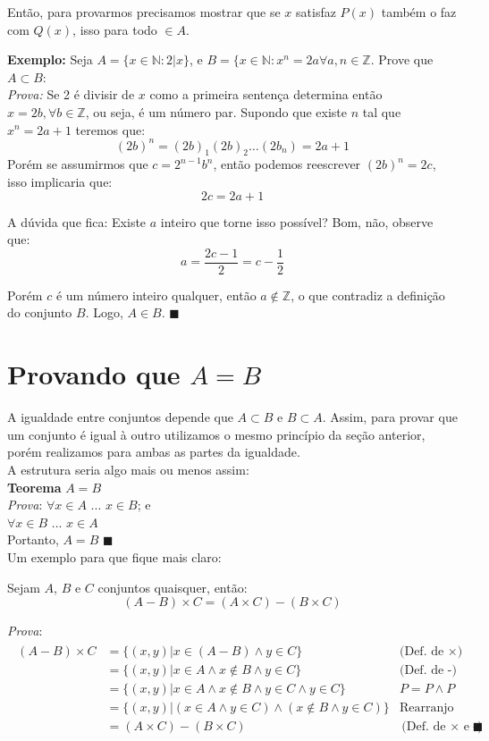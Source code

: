 \documentclass[book_of_proof.tex]{subfiles}
\begin{document}
Então, para provarmos precisamos mostrar que se $x$ satisfaz $P(x)$ também o faz com $Q(x)$, isso para todo $\in A$.

\textbf{Exemplo: } Seja $A = \lbrace x \in \mathbb{N} : 2|x \rbrace$, e $B = \lbrace x \in \mathbb{N} : x^n = 2a \forall a,n \in \mathbb{Z}$. Prove que $A \subset B$:
\\
\textit{Prova:} Se 2 é divisir de $x$ como a primeira sentença determina então $x = 2b, \forall b \in \mathbb{Z}$, ou seja, é um número par. Supondo que existe $n$ tal que $x^n = 2a + 1$ teremos que:
$$(2b)^n = (2b)_1(2b)_2 \dots (2b_n) = 2a + 1$$
Porém se assumirmos que $c = 2^{n-1}b^n$, então podemos reescrever $(2b)^n = 2c$, isso implicaria que:
$$2c = 2a + 1$$

A dúvida que fica: Existe $a$ inteiro que torne isso possível? Bom, não, observe que:
$$ a  = \frac{2c -  1}{2} = c - \frac{1}{2}$$

Porém $c$ é um número inteiro qualquer, então $a \not\in \mathbb{Z}$, o que contradiz a definição do conjunto $B$. Logo, $A \in B$. $\blacksquare$

\section{Provando que $A = B$}

A igualdade entre conjuntos depende que $A \subset B$ e $B \subset A$. Assim, para provar que um conjunto é igual à outro utilizamos o mesmo princípio da seção anterior, porém realizamos para ambas as partes da igualdade.\\
A estrutura seria algo mais ou menos assim:\\

\textbf{Teorema} $A = B$\\
\textit{Prova}: $\forall x \in A$ ... $x \in B$; e
\\
$\forall x \in B$ ... $x \in A$ 
\\
Portanto, $A = B$ $\blacksquare$
\\
Um exemplo para que fique mais claro:

\begin{theorem}
Sejam $A$, $B$ e $C$ conjuntos quaisquer, então:
$$(A - B) \times C = (A \times C) - (B \times C)$$
\end{theorem}
\textit{Prova}:
\begin{align*}
	\begin{aligned}
	(A - B) \times C & = \{(x,y) | x \in (A-B) \land y \in C\} \ \ \ \ \ \ \ \  & \text{(Def. de $\times$)} \\
					 & = \{(x,y) | x \in A \land x \not\in B \land y \in C \} & \text{(Def. de -})  \\
					 & = \{(x,y) | x \in A \land x \not\in B \land y \in C \land y \in C\} & P = P\land P \\
					 & = \{(x,y) | (x \in A \land  y \in C) \land (x \not\in B \land y \in C)\} & \text{Rearranjo} \\
					 & = (A \times C) - (B \times C)			& \text{(Def. de $\times$ e -)} \blacksquare
	\end{aligned}
\end{align*} 
\end{document}
